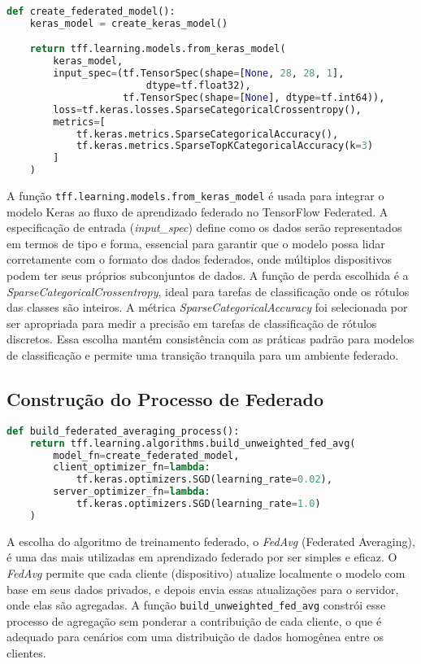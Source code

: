 \begin{lstlisting}[language=Python, caption={Construção do modelo federado}, label={lst:build_federated_model}]
    def create_federated_model():
    keras_model = create_keras_model()

    return tff.learning.models.from_keras_model(
        keras_model,
        input_spec=(tf.TensorSpec(shape=[None, 28, 28, 1], 
                        dtype=tf.float32),
                    tf.TensorSpec(shape=[None], dtype=tf.int64)),
        loss=tf.keras.losses.SparseCategoricalCrossentropy(),
        metrics=[
            tf.keras.metrics.SparseCategoricalAccuracy(),
            tf.keras.metrics.SparseTopKCategoricalAccuracy(k=3)
        ]
    )
\end{lstlisting}

A função \texttt{tff.learning.models.from\_keras\_model} é usada para integrar o modelo Keras ao fluxo de aprendizado federado no TensorFlow Federated. A especificação de entrada (\textit{input\_spec}) define como os dados serão representados em termos de tipo e forma, essencial para garantir que o modelo possa lidar corretamente com o formato dos dados federados, onde múltiplos dispositivos podem ter seus próprios subconjuntos de dados. A função de perda escolhida é a \textit{SparseCategoricalCrossentropy}, ideal para tarefas de classificação onde os rótulos das classes são inteiros. A métrica \textit{SparseCategoricalAccuracy} foi selecionada por ser apropriada para medir a precisão em tarefas de classificação de rótulos discretos. Essa escolha mantém consistência com as práticas padrão para modelos de classificação e permite uma transição tranquila para um ambiente federado.

\subsection{Construção do Processo de Federado}

\begin{lstlisting}[language=Python, caption={Construção do processo federado}, label={lst:build_federated_process}]
    def build_federated_averaging_process():
    return tff.learning.algorithms.build_unweighted_fed_avg(
        model_fn=create_federated_model,
        client_optimizer_fn=lambda: 
            tf.keras.optimizers.SGD(learning_rate=0.02),
        server_optimizer_fn=lambda: 
            tf.keras.optimizers.SGD(learning_rate=1.0)
    )
\end{lstlisting}

A escolha do algoritmo de treinamento federado, o \textit{FedAvg} (Federated Averaging), é uma das mais utilizadas em aprendizado federado por ser simples e eficaz. O \textit{FedAvg} permite que cada cliente (dispositivo) atualize localmente o modelo com base em seus dados privados, e depois envia essas atualizações para o servidor, onde elas são agregadas. A função \texttt{build\_unweighted\_fed\_avg} constrói esse processo de agregação sem ponderar a contribuição de cada cliente, o que é adequado para cenários com uma distribuição de dados homogênea entre os clientes. 

